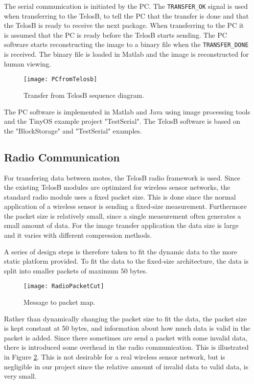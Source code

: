 The serial communication is initiated by the PC.
The \texttt{TRANSFER\_OK} signal is used when transferring to the TelosB, to tell the PC that the transfer is done and that the TelosB is ready to receive the next package.
When transferring to the PC it is assumed that the PC is ready before the TelosB starts sending.
The PC software starts reconstructing the image to a binary file when the \texttt{TRANSFER\_DONE} is received.
The binary file is loaded in Matlab and the image is reconstructed for human viewing.
\begin{figure}[H]
	\centering
	\texttt{[image: PCfromTelosb]}
	\caption{Transfer from TelosB sequence diagram.}
	\label{transferfromtelos}
\end{figure}
The PC software is implemented in Matlab and Java using image processing tools and the TinyOS example project "TestSerial".
The TelosB software is based on the "BlockStorage" and "TestSerial" examples.


\subsection{Radio Communication}\label{sec:Radio-Block}

For transfering data between motes, the TelosB radio framework is used. 
Since the existing TelosB modules are optimized for wireless sensor networks, the standard radio module uses a fixed packet size. 
This is done since the normal application of a wireless sensor is sending a fixed-size measurement. 
Furthermore the packet size is relatively small, since a single measurement often generates a small amount of data. 
For the image transfer application the data size is large and it varies with different compression methods.

A series of design steps is therefore taken to fit the dynamic data to the more static platform provided. 
To fit the data to the fixed-size architecture, the data is split into smaller packets of maximum 50 bytes. 

\begin{figure}[H]
	\centering
	\texttt{[image: RadioPacketCut]}
	\caption{Message to packet map.}
	\label{fig:RadioPacketCut}
\end{figure}

Rather than dynamically changing the packet size to fit the data, the packet size is kept constant at  50 bytes, and information about how much data is valid in the packet is added. 
Since there sometimes are send a packet with some invalid data, there is introduced some overhead in the radio communication. 
This is illustrated in Figure \ref{fig:RadioPacketCut}. 
This is not desirable for a real wireless sensor network, but is negligible in our project since the relative amount of invalid data to valid data, is very small. 

